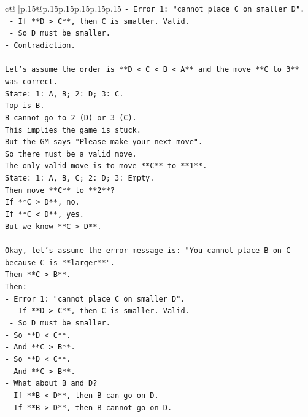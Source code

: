 \documentclass{article}
\begin{document}
{\begin{supertabular}{c@{$\;$}|p{.15\linewidth}@{}p{.15\linewidth}p{.15\linewidth}p{.15\linewidth}p{.15\linewidth}p{.15\linewidth}}
{{{\texttt{{-} Error 1: "cannot place C on smaller D".} \\
\texttt{    {-} If **D > C**, then C is smaller. Valid.} \\
\texttt{    {-} So D must be smaller.} \\
\texttt{{-} Contradiction.} \\
\\ 
\texttt{Let's assume the order is **D < C < B < A** and the move **C to 3** was correct.} \\
\texttt{State: 1: A, B; 2: D; 3: C.} \\
\texttt{Top is B.} \\
\texttt{B cannot go to 2 (D) or 3 (C).} \\
\texttt{This implies the game is stuck.} \\
\texttt{But the GM says "Please make your next move".} \\
\texttt{So there must be a valid move.} \\
\texttt{The only valid move is to move **C** to **1**.} \\
\texttt{State: 1: A, B, C; 2: D; 3: Empty.} \\
\texttt{Then move **C** to **2**?} \\
\texttt{If **C > D**, no.} \\
\texttt{If **C < D**, yes.} \\
\texttt{But we know **C > D**.} \\
\\ 
\texttt{Okay, let's assume the error message is: "You cannot place B on C because C is **larger**".} \\
\texttt{Then **C > B**.} \\
\texttt{Then:} \\
\texttt{{-} Error 1: "cannot place C on smaller D".} \\
\texttt{    {-} If **D > C**, then C is smaller. Valid.} \\
\texttt{    {-} So D must be smaller.} \\
\texttt{{-} So **D < C**.} \\
\texttt{{-} And **C > B**.} \\
\texttt{{-} So **D < C**.} \\
\texttt{{-} And **C > B**.} \\
\texttt{{-} What about B and D?} \\
\texttt{{-} If **B < D**, then B can go on D.} \\
\texttt{{-} If **B > D**, then B cannot go on D.} \\
}}}
\end{supertabular}}
\end{document}
